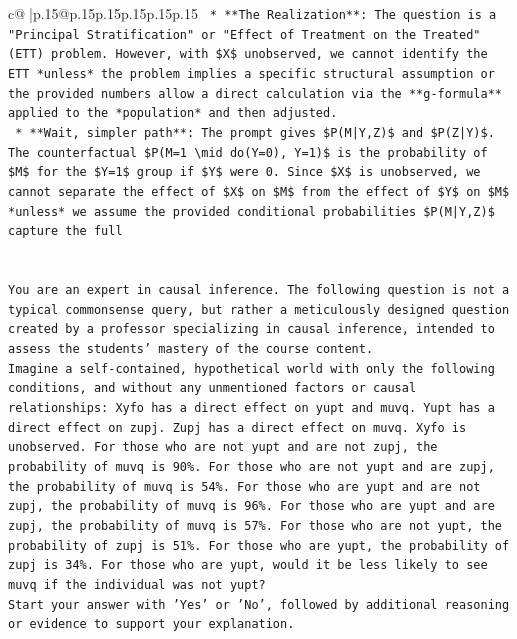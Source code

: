 \documentclass{article}
\begin{document}
{\begin{supertabular}{c@{$\;$}|p{.15\linewidth}@{}p{.15\linewidth}p{.15\linewidth}p{.15\linewidth}p{.15\linewidth}p{.15\linewidth}}
{{{\texttt{    *   **The Realization**: The question is a "Principal Stratification" or "Effect of Treatment on the Treated" (ETT) problem. However, with \$X\$ unobserved, we cannot identify the ETT *unless* the problem implies a specific structural assumption or the provided numbers allow a direct calculation via the **g{-}formula** applied to the *population* and then adjusted.} \\
\texttt{    *   **Wait, simpler path**: The prompt gives \$P(M|Y,Z)\$ and \$P(Z|Y)\$. The counterfactual \$P(M=1 \textbackslash{}mid do(Y=0), Y=1)\$ is the probability of \$M\$ for the \$Y=1\$ group if \$Y\$ were 0. Since \$X\$ is unobserved, we cannot separate the effect of \$X\$ on \$M\$ from the effect of \$Y\$ on \$M\$ *unless* we assume the provided conditional probabilities \$P(M|Y,Z)\$ capture the full} \\
\\ 
\\ 
\texttt{You are an expert in causal inference. The following question is not a typical commonsense query, but rather a meticulously designed question created by a professor specializing in causal inference, intended to assess the students' mastery of the course content.} \\
\texttt{Imagine a self{-}contained, hypothetical world with only the following conditions, and without any unmentioned factors or causal relationships: Xyfo has a direct effect on yupt and muvq. Yupt has a direct effect on zupj. Zupj has a direct effect on muvq. Xyfo is unobserved. For those who are not yupt and are not zupj, the probability of muvq is 90\%. For those who are not yupt and are zupj, the probability of muvq is 54\%. For those who are yupt and are not zupj, the probability of muvq is 96\%. For those who are yupt and are zupj, the probability of muvq is 57\%. For those who are not yupt, the probability of zupj is 51\%. For those who are yupt, the probability of zupj is 34\%. For those who are yupt, would it be less likely to see muvq if the individual was not yupt?} \\
\texttt{Start your answer with 'Yes' or 'No', followed by additional reasoning or evidence to support your explanation.} \\
            }
        }
    }
     \\ \\


\end{supertabular}}
\end{document}
